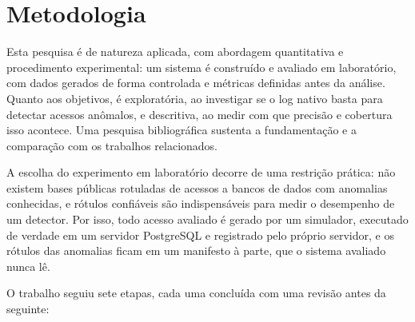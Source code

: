 
\section{Metodologia}
\label{sec:metodologia}

Esta pesquisa é de natureza aplicada, com abordagem quantitativa e procedimento experimental:
um sistema é construído e avaliado em laboratório, com dados gerados de forma controlada e
métricas definidas antes da análise. Quanto aos objetivos, é exploratória, ao investigar se o
log nativo basta para detectar acessos anômalos, e descritiva, ao medir com que precisão e
cobertura isso acontece. Uma pesquisa bibliográfica sustenta a fundamentação e a comparação
com os trabalhos relacionados.

A escolha do experimento em laboratório decorre de uma restrição prática: não existem bases
públicas rotuladas de acessos a bancos de dados com anomalias conhecidas, e rótulos confiáveis
são indispensáveis para medir o desempenho de um detector. Por isso, todo acesso avaliado é
gerado por um simulador, executado de verdade em um servidor PostgreSQL e registrado pelo
próprio servidor, e os rótulos das anomalias ficam em um manifesto à parte, que o sistema
avaliado nunca lê.

O trabalho seguiu sete etapas, cada uma concluída com uma revisão antes da seguinte:


